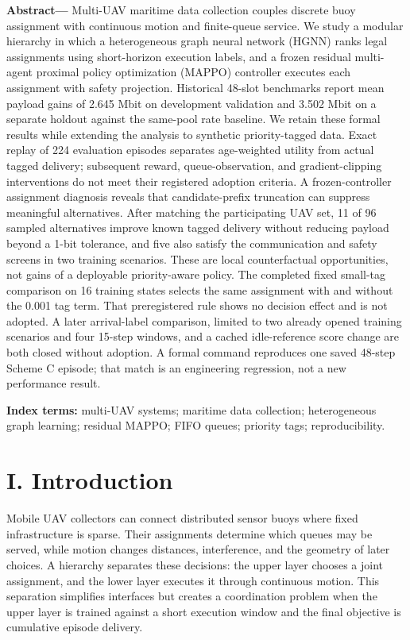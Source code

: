 
\noindent\textbf{Abstract---} Multi-UAV maritime data collection couples discrete buoy assignment with continuous motion and finite-queue service. We study a modular hierarchy in which a heterogeneous graph neural network (HGNN) ranks legal assignments using short-horizon execution labels, and a frozen residual multi-agent proximal policy optimization (MAPPO) controller executes each assignment with safety projection. Historical 48-slot benchmarks report mean payload gains of 2.645 Mbit on development validation and 3.502 Mbit on a separate holdout against the same-pool rate baseline. We retain these formal results while extending the analysis to synthetic priority-tagged data. Exact replay of 224 evaluation episodes separates age-weighted utility from actual tagged delivery; subsequent reward, queue-observation, and gradient-clipping interventions do not meet their registered adoption criteria. A frozen-controller assignment diagnosis reveals that candidate-prefix truncation can suppress meaningful alternatives. After matching the participating UAV set, 11 of 96 sampled alternatives improve known tagged delivery without reducing payload beyond a 1-bit tolerance, and five also satisfy the communication and safety screens in two training scenarios. These are local counterfactual opportunities, not gains of a deployable priority-aware policy. The completed fixed small-tag comparison on 16 training states selects the same assignment with and without the 0.001 tag term. That preregistered rule shows no decision effect and is not adopted. A later arrival-label comparison, limited to two already opened training scenarios and four 15-step windows, and a cached idle-reference score change are both closed without adoption. A formal command reproduces one saved 48-step Scheme C episode; that match is an engineering regression, not a new performance result.

\textbf{Index terms:} multi-UAV systems; maritime data collection; heterogeneous graph learning; residual MAPPO; FIFO queues; priority tags; reproducibility.

\section*{I. Introduction}

Mobile UAV collectors can connect distributed sensor buoys where fixed infrastructure is sparse. Their assignments determine which queues may be served, while motion changes distances, interference, and the geometry of later choices. A hierarchy separates these decisions: the upper layer chooses a joint assignment, and the lower layer executes it through continuous motion. This separation simplifies interfaces but creates a coordination problem when the upper layer is trained against a short execution window and the final objective is cumulative episode delivery.

